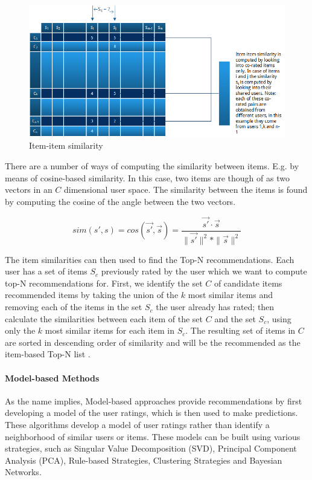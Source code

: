 \begin{figure}[H]
    \includegraphics[width=5in]{image/itemsim.png}
    \centering
    \caption[Item-item similarity]{Item-item similarity}
    \label{figure:itemsim}
\end{figure}

There are a number of ways of computing the similarity between items. E.g. by
means of cosine-based similarity. In this case, two items are though of as two
vectors in an $C$ dimensional user space. The similarity between the items is
found by computing the cosine of the angle between the two vectors.

\begin{equation}
sim(s',s) = cos(\vec{s'},\vec{s}) = \frac{\vec{s'} \cdot \vec{s}}{\|\vec{s'}\|^{2} * \|\vec{s}\|^{2}}
\end{equation}

The item similarities can then used to find the Top-N recommendations. Each
user has a set of items $S_{c}$ previously rated by the user which we want to
compute top-N recommendations for. First, we identify the set $C$ of candidate
items recommended items by taking the union of the $k$ most similar items and
removing each of the items in the set $S_{c}$ the user already has rated; then
calculate the similarities between each item of the set $C$ and the set
$S_{c}$, using only the $k$ most similar items for each item in $S_{c}$. The
resulting set of items in $C$ are sorted in descending order of similarity and
will be the recommended as the item-based Top-N list \cite{Karypis2001}.

\paragraph{Model-based Methods}

As the name implies, Model-based approaches provide recommendations by first
developing a model of the user ratings, which is then used to make predictions.
These algorithms develop a model of user ratings rather than identify a
neighborhood of similar users or items. These models can be built using various
strategies, such as Singular Value Decomposition (SVD), Principal Component
Analysis (PCA), Rule-based Strategies, Clustering Strategies and Bayesian
Networks.

